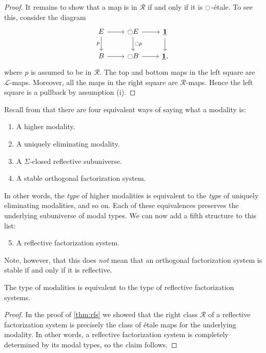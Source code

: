 \documentclass[9pt,twosided]{amsart}
\begin{document}
\begin{proof}
  It remains to show that a map is in $\mathcal{R}$ if and only if it is ${\ocircle}$-\'etale. To see this, consider the diagram
  \begin{equation*}
    \begin{tikzcd}
      E \arrow[d,swap,"p"] \arrow[r] & \modal E \arrow[d,"\modal p"] \arrow[r] & \unit \arrow[d] \\
      B \arrow[r] & \modal B \arrow[r] & \unit,
    \end{tikzcd}
  \end{equation*}
  where $p$ is assumed to be in $\mathcal{R}$. The top and bottom maps in the left square are $\mathcal{L}$-maps. Moreover, all the maps in the right square are $\mathcal{R}$-maps. Hence the left square is a pullback by assumption (i).
\end{proof}

Recall from \cite[Section 1]{RijkeSpittersShulman} that there are four equivalent ways of saying what a modality is:
\begin{enumerate}
\item A higher modality.
\item A uniquely eliminating modality.
\item A $\Sigma$-closed reflective subuniverse.
\item A stable orthogonal factorization system.
\end{enumerate}
In other words, the \emph{type} of higher modalities is equivalent to the \emph{type} of uniquely eliminating modalities, and so on. Each of these equivalences preserves the underlying subuniverse of modal types. We can now add a fifth structure to this list:
\begin{enumerate}
  \setcounter{enumi}{4}
\item A reflective factorization system.
\end{enumerate}
Note, however, that this does \emph{not} mean that an orthogonal factorization system is stable if and only if it is reflective. 

\begin{thm}
  The type of modalities is equivalent to the type of reflective factorization systems.
\end{thm}

\begin{proof}
  In the proof of \cref{thm:rfs} we showed that the right class $\mathcal{R}$ of a reflective factorization system is precisely the class of \'etale maps for the underlying modality. In other words, a reflective factorization system is completely determined by its modal types, so the claim follows.
\end{proof}
\end{document}
